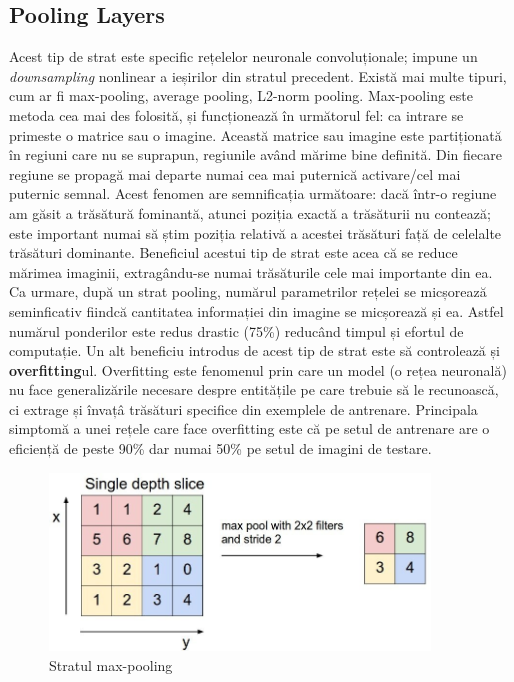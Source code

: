 \subsection{Pooling Layers}
Acest tip de strat este specific rețelelor neuronale convoluționale; impune un \textit{downsampling} nonlinear a ieșirilor din stratul precedent. Există mai multe tipuri, cum ar fi max-pooling, average pooling, L2-norm pooling.\newline
Max-pooling este metoda cea mai des folosită, și funcționează în următorul fel: ca intrare se primeste o matrice sau o imagine. Această matrice sau imagine este partiționată în regiuni care nu se suprapun, regiunile având mărime bine definită. Din fiecare regiune se propagă mai departe numai cea mai puternică activare/cel mai puternic semnal. Acest fenomen are semnificația următoare: dacă într-o regiune am găsit a trăsătură fominantă, atunci poziția exactă a trăsăturii nu contează; este important numai să știm poziția relativă a acestei trăsături față de celelalte trăsături dominante.\newline
Beneficiul acestui tip de strat este acea că se reduce mărimea imaginii, extragându-se numai trăsăturile cele mai importante din ea. Ca urmare, după un strat pooling, numărul parametrilor rețelei se micșorează seminficativ fiindcă cantitatea informației din imagine se micșorează și ea. Astfel numărul ponderilor este redus drastic (75\%) reducând timpul și efortul de computație. Un alt beneficiu introdus de acest tip de strat este să controlează și \textbf{overfitting}ul. Overfitting este fenomenul prin care un model (o rețea neuronală) nu face generalizările necesare despre entitățile pe care trebuie să le recunoască, ci extrage și învațâ trăsături specifice din exemplele de antrenare. Principala simptomă a unei rețele care face overfitting este că pe setul de antrenare are o eficiență de peste 90\% dar numai 50\% pe setul de imagini de testare.

\begin{figure}[h!]
    	\centering
	\captionsetup{justification=centering, margin=2cm}
	\includegraphics[width=0.9\textwidth]{figures/max_pol.jpg}
	\caption{Stratul max-pooling \cite{max_pol}}
	\label{fig:Stratul max-pooling }
\end{figure}

